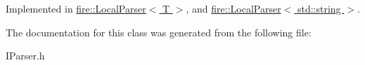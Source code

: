 Implemented in \hyperlink{a00019_aed4357541f2ff7d46f8846bd07bb3c42}{fire\+::\+Local\+Parser$<$ T $>$}, and \hyperlink{a00019_aed4357541f2ff7d46f8846bd07bb3c42}{fire\+::\+Local\+Parser$<$ std\+::string $>$}.



The documentation for this class was generated from the following file\+:\begin{DoxyCompactItemize}
\item 
I\+Parser.\+h\end{DoxyCompactItemize}
